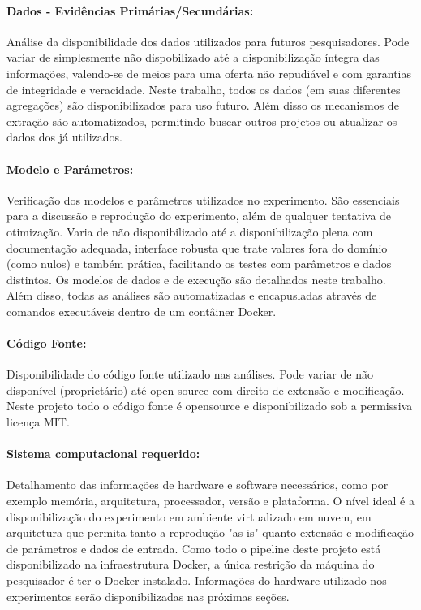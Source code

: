 \documentclass[sigconf]{acmart}
\begin{document}
\paragraph{Dados - Evidências Primárias/Secundárias:} Análise da disponibilidade dos dados utilizados para futuros pesquisadores. Pode variar de simplesmente não dispobilizado até a disponibilização íntegra das informações, valendo-se de meios para uma oferta não repudiável e com garantias de integridade e veracidade. Neste trabalho, todos os dados (em suas diferentes agregações) são disponibilizados para uso futuro. Além disso os mecanismos de extração são automatizados, permitindo buscar outros projetos ou atualizar os dados dos já utilizados.

\paragraph{Modelo e Parâmetros:} Verificação dos modelos e parâmetros utilizados no experimento. São essenciais para a discussão e reprodução do experimento, além de qualquer tentativa de otimização. Varia de não disponibilizado até a disponibilização plena com documentação adequada, interface robusta que trate valores fora do domínio (como nulos) e também prática, facilitando os testes com parâmetros e dados distintos. Os modelos de dados e de execução são detalhados neste trabalho. Além disso, todas as análises são automatizadas e encapusladas através de comandos executáveis dentro de um contâiner Docker.

\paragraph{Código Fonte:} Disponibilidade do código fonte utilizado nas análises. Pode variar de não disponível (proprietário) até open source com direito de extensão e modificação. Neste projeto todo o código fonte é opensource e disponibilizado sob a permissiva licença MIT.

\paragraph{Sistema computacional requerido:} Detalhamento das informações de hardware e software necessários, como por exemplo memória, arquitetura, processador, versão e plataforma. O nível ideal é a disponibilização do experimento em ambiente virtualizado em nuvem, em arquitetura que permita tanto a reprodução "as is" quanto extensão e modificação de parâmetros e dados de entrada. Como todo o pipeline deste projeto está disponibilizado na infraestrutura Docker, a única restrição da máquina do pesquisador é ter o Docker instalado. Informações do hardware utilizado nos experimentos serão disponibilizadas nas próximas seções.
\end{document}
